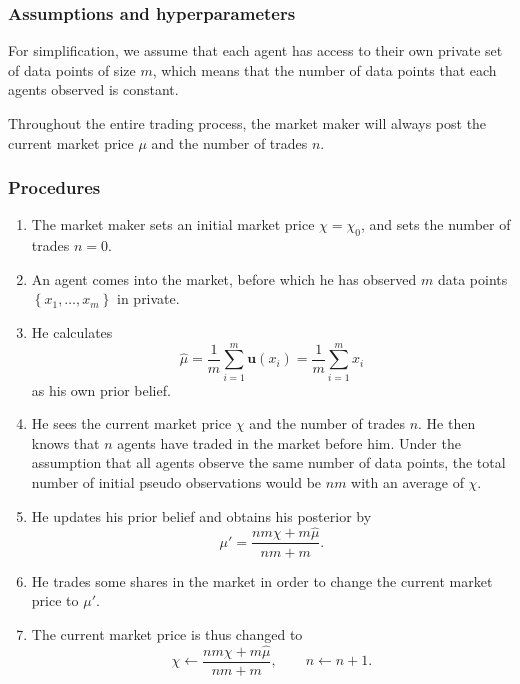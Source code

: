 \documentclass[12pt]{article}
\begin{document}
\subsubsection{Assumptions and hyperparameters} 
For simplification, we assume that each agent has access to their own private set of data points of size $m$, which means that the number of data points that each agents observed is constant.

Throughout the entire trading process, the market maker will always post the current market price $\mu$ and the number of trades $n$.
\subsubsection{Procedures}
\begin{enumerate}
    \item The market maker sets an initial market price $\chi=\chi_0$, and sets the number of trades $n=0$.
    \item An agent comes into the market, before which he has observed $m$ data points $\left\{ x_1,\ldots,x_m\right\}$ in private.
    \item He calculates 
    \[\hat{\mu}=\frac{1}{m}\sum_{i=1}^m \mathbf{u}(x_i)=\frac{1}{m}\sum_{i=1}^m x_i\]
    as his own prior belief.
    \item He sees the current market price $\chi$ and the number of trades $n$. He then knows that $n$ agents have traded in the market before him. Under the assumption that all agents observe the same number of data points, the total number of initial pseudo observations would be $nm$ with an average of $\chi$.
    \item He updates his prior belief and obtains his posterior by 
    \[\mu'=\frac{nm\chi+m\hat{\mu}}{nm+m}.\]
    \item He trades some shares in the market in order to change the current market price to $\mu'$.
    \item The current market price is thus changed to 
    \[\chi\leftarrow\frac{nm\chi+m\hat{\mu}}{nm+m},\qquad n\leftarrow n+1.\]
\end{enumerate}
\end{document}
